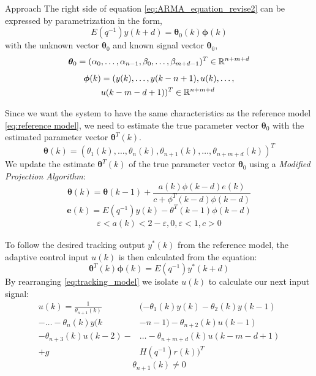 \begin{section}{Approach}
The right side of equation \eqref{eq:ARMA_equation_revise2} can be expressed by parametrization in the form,
    \begin{equation}
	E(q^{-1})y(k+d)=\bm{\theta}_0(k)\bm{\phi}(k)
	\end{equation}
with the unknown vector $\bm{\theta}_0$ and known signal vector $\bm{\theta}_0$,
    \begin{equation}
	\bm{\theta}_0=(\alpha_0, \dots ,\alpha_{n-1},\beta_0, \dots ,\beta_{m+d-1})^T \in \mathbb{R}^{n+m+d}
	\end{equation}
	\begin{align}
	\begin{split}
	\bm{\phi}(k)&=(y(k), \dots ,y(k-n+1),u(k), \dots , \\
	& u(k-m-d+1))^T \in \mathbb{R}^{n+m+d}
	\end{split}
	\end{align}
	
Since we want the system to have the same characteristics as the reference model \eqref{eq:reference model}, we need to estimate the true parameter vector $\bm{\theta}_0$ with the estimated parameter vector $\bm{\theta}^T(k)$. 
    \begin{equation}
    \bm{\theta}(k)=(\theta_1(k), \dots ,\theta_n(k),\theta_{n+1}(k), \dots ,\theta_{n+m+d}(k))^T
	\end{equation}
We update the estimate $\bm{\theta}^T(k)$ of the true parameter vector $\bm{\theta}_0$ using a \textit{Modified Projection Algorithm}:
	\begin{equation}
	\label{eq:Modified_Proj_Algorithm}
	\bm{\theta}(k)=\bm{\theta}(k-1)+\frac{a(k)\phi(k-d)e(k)}{c+\phi^T(k-d)\phi(k-d)}
	\end{equation}
	\begin{equation}
	\bm{e}(k)=E(q^{-1})y(k)-\theta^T(k-1)\phi(k-d)
	\end{equation}
	\begin{align*}
	\varepsilon<a(k)<2-\varepsilon, 0,\varepsilon<1, c>0
	\end{align*}
	
To follow the desired tracking output $y^*(k)$ from the reference model, the adaptive control input $u(k)$ is then calculated from the equation:
    \begin{equation}
    \label{eq:tracking_model}
	\bm{\theta}^T(k)\bm{\phi}(k)=E(q^{-1})y^*(k+d)
	\end{equation}
By rearranging \eqref{eq:tracking_model} we isolate $u(k)$ to calculate our next input signal:
	\begin{align}
	u(k)=\frac{1}{\theta_{n+1}(k)}&(-\theta_1(k)y(k)-\theta_2(k)y(k-1)  \nonumber \\
    -\dots-\theta_n(k)y(k&-n-1)-\theta_{n+2}(k)u(k-1)  \\
	-\theta_{n+3}(k)u(k-2)-& \dots - \theta_{n+m+d}(k)u(k-m-d+1) \nonumber \\
	+g&H(q^{-1})r(k))^T \nonumber
	\end{align}
    \begin{equation}
	\theta_{n+1}(k)\neq0 \nonumber
	\end{equation}
	



\end{section}
